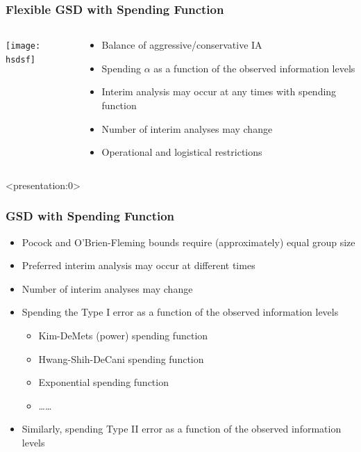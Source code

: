 \documentclass{beamer}
\begin{document}
\begin{frame}
	\frametitle{Flexible GSD with Spending Function}
\begin{columns}
	\begin{column}{0.48\textwidth}
		\texttt{[image: hsdsf]} 
	\end{column}
	\begin{column}{0.48\textwidth}	
	\begin{itemize}
		\item Balance of aggressive/conservative IA
		\item Spending $\alpha$ as a function of the observed information levels
		\item Interim analysis may occur at any times with spending function
		\item Number of interim analyses may change
		\item Operational and logistical restrictions
	\end{itemize}
	\end{column}
\end{columns}
\end{frame}
\begin{frame}<presentation:0>
	\frametitle{GSD with Spending Function}
\begin{itemize}
	\item Pocock and O'Brien-Fleming bounds require (approximately) equal group size
	\item Preferred interim analysis may occur at different times
	\item Number of interim analyses may change
	\item Spending the Type I error as a function of the observed information levels
	\begin{itemize}
		\item Kim-DeMets (power) spending function
		\item Hwang-Shih-DeCani spending function
		\item Exponential spending function
		\item \ldots \ldots
	\end{itemize}
	\item Similarly, spending Type II error as a function of the observed information levels 	
\end{itemize}
\end{frame}\addtocounter{framenumber}{-1}
\end{document}
